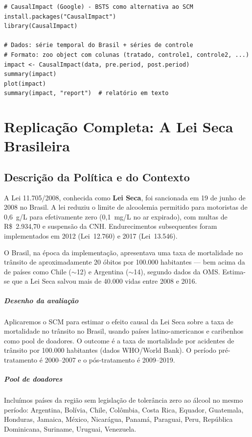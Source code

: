 \documentclass[12pt, a4paper, openany]{book}
\begin{document}
\begin{lstlisting}[style=Rstyle]
# CausalImpact (Google) - BSTS como alternativa ao SCM
install.packages("CausalImpact")
library(CausalImpact)

# Dados: série temporal do Brasil + séries de controle
# Formato: zoo object com colunas (tratado, controle1, controle2, ...)
impact <- CausalImpact(data, pre.period, post.period)
summary(impact)
plot(impact)
summary(impact, "report")  # relatório em texto
\end{lstlisting}


\newpage
\chapter{Replicação Completa: A Lei Seca Brasileira}

\section{Descrição da Política e do Contexto}

A Lei 11.705/2008, conhecida como \textbf{Lei Seca}, foi sancionada em 19 de junho de 2008 no Brasil. A lei reduziu o limite de alcoolemia permitido para motoristas de 0,6~g/L para efetivamente zero (0,1~mg/L no ar expirado), com multas de R\$~2.934,70 e suspensão da CNH. Endurecimentos subsequentes foram implementados em 2012 (Lei~12.760) e 2017 (Lei~13.546).

O Brasil, na época da implementação, apresentava uma taxa de mortalidade no trânsito de aproximadamente 20 óbitos por 100.000 habitantes --- bem acima da de países como Chile ($\sim$12) e Argentina ($\sim$14), segundo dados da OMS. Estima-se que a Lei Seca salvou mais de 40.000 vidas entre 2008 e 2016.

\paragraph{Desenho da avaliação} Aplicaremos o SCM para estimar o efeito causal da Lei Seca sobre a taxa de mortalidade no trânsito no Brasil, usando países latino-americanos e caribenhos como pool de doadores. O outcome é a taxa de mortalidade por acidentes de trânsito por 100.000 habitantes (dados WHO/World Bank). O período pré-tratamento é 2000--2007 e o pós-tratamento é 2009--2019.

\paragraph{Pool de doadores} Incluímos países da região sem legislação de tolerância zero ao álcool no mesmo período: Argentina, Bolívia, Chile, Colômbia, Costa Rica, Equador, Guatemala, Honduras, Jamaica, México, Nicarágua, Panamá, Paraguai, Peru, República Dominicana, Suriname, Uruguai, Venezuela.
\end{document}
